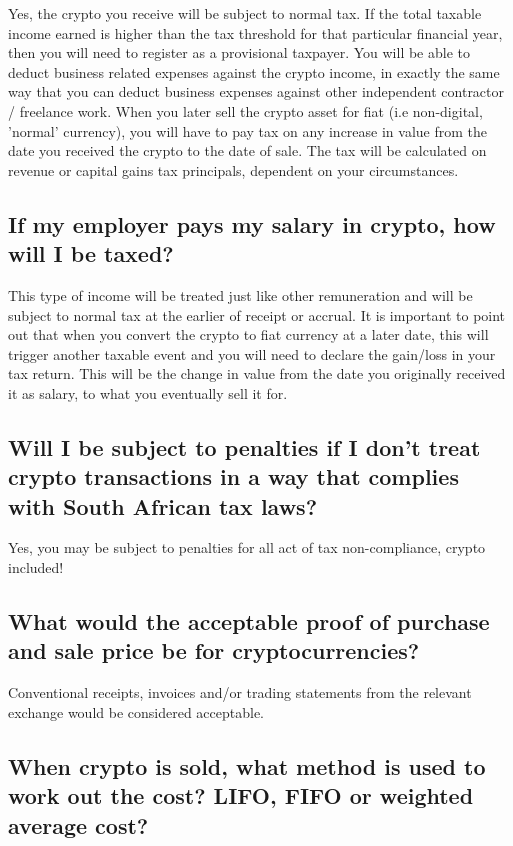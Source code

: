 Yes, the crypto you receive will be subject to normal tax. If the total taxable income earned is higher than the tax threshold for that particular financial year, then you will need to register as a provisional taxpayer. You will be able to deduct business related expenses against the crypto income, in exactly the same way that you can deduct business expenses against other independent contractor / freelance work. When you later sell the crypto asset for fiat (i.e non-digital, 'normal' currency), you will have to pay  tax on any increase in value from the date you received the crypto to the date of sale. The tax will be calculated on revenue or capital gains tax principals, dependent on your circumstances.


\subsection{If my employer pays my salary in crypto, how will I be taxed?}

This type of income will be treated just like other remuneration and will be subject to normal tax at the earlier of receipt or accrual. It is important to point out that when you convert the crypto to fiat currency at a later date, this will trigger another taxable event and you will need to declare the gain/loss in your tax return.  This will be the change in value from the date you originally received it as salary, to what you eventually sell it for. 

\subsection{Will I be subject to penalties if I don't treat crypto transactions in a way that complies with South African tax laws?}

Yes, you may be subject to penalties for all act of tax non-compliance, crypto included!


\subsection{What would the acceptable proof of purchase and sale price be for cryptocurrencies?}

Conventional receipts, invoices and/or trading statements from the relevant exchange would be considered acceptable.


\subsection{When crypto is sold, what method is used to work out the cost? LIFO, FIFO or weighted average cost?}

